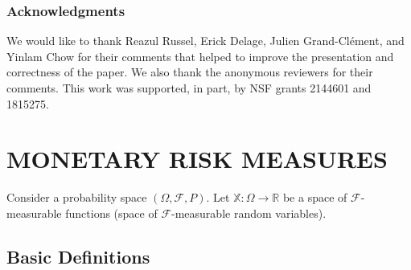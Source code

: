 \documentclass[twoside]{article}
\newcommand{\Real}{\mathbb{R}}
\theoremstyle{plain}
\theoremstyle{definition}
\theoremstyle{remark}
\renewcommand{\cite}[1]{\citep{#1}}
\begin{document}


\subsubsection*{Acknowledgments}
We would like to thank Reazul Russel, Erick Delage, Julien Grand-Cl\'ement, and Yinlam Chow for their comments that helped to improve the presentation and correctness of the paper. We also thank the anonymous reviewers for their comments. This work was supported, in part, by NSF grants 2144601 and 1815275.





\clearpage
\onecolumn
\appendix

\section{MONETARY RISK MEASURES}
\label{ent:secapp:risk-measure-prop}

Consider a probability space $(\Omega,\mathcal F,P)$. %
Let $\mathbb X\colon \Omega\rightarrow\mathbb R$ be a space of $\mathcal F$-measurable functions (space of $\mathcal F$-measurable random variables). 

\subsection{Basic Definitions}
\end{document}
